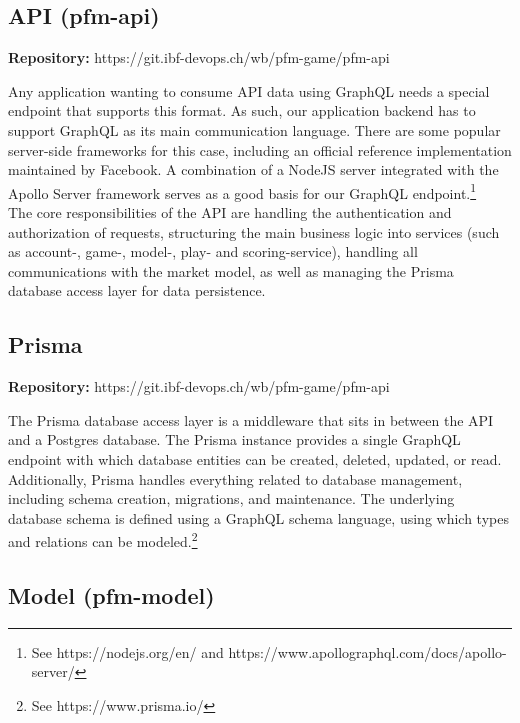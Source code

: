 \subsection{API (pfm-api)}
\begin{flushright}
  \textbf{Repository:} https://git.ibf-devops.ch/wb/pfm-game/pfm-api
\end{flushright}

Any application wanting to consume API data using GraphQL needs a special endpoint that supports this format. As such, our application backend has to support GraphQL as its main communication language. There are some popular server-side frameworks for this case, including an official reference implementation maintained by Facebook. A combination of a NodeJS server integrated with the Apollo Server framework serves as a good basis for our GraphQL endpoint.\footnote{See https://nodejs.org/en/ and https://www.apollographql.com/docs/apollo-server/}\\

The core responsibilities of the API are handling the authentication and authorization of requests, structuring the main business logic into services (such as account-, game-, model-, play- and scoring-service), handling all communications with the market model, as well as managing the Prisma database access layer for data persistence.


\subsection{Prisma}

\begin{flushright}
  \textbf{Repository:} https://git.ibf-devops.ch/wb/pfm-game/pfm-api
\end{flushright}

The Prisma database access layer is a middleware that sits in between the API and a Postgres database. The Prisma instance provides a single GraphQL endpoint with which database entities can be created, deleted, updated, or read. Additionally, Prisma handles everything related to database management, including schema creation, migrations, and maintenance. The underlying database schema is defined using a GraphQL schema language, using which types and relations can be modeled.\footnote{See https://www.prisma.io/}


\subsection{Model (pfm-model)}

